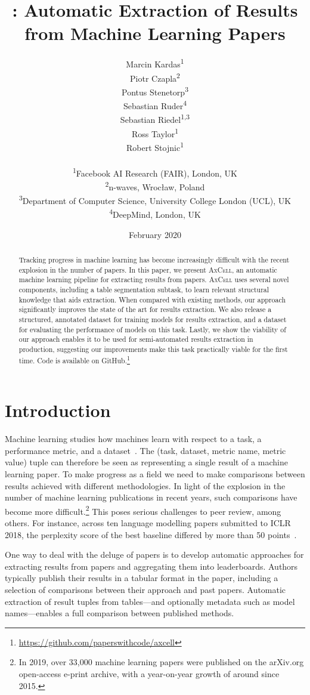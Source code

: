 \documentclass[11pt,a4paper]{article}
\title{\model{}: Automatic Extraction of Results\\from Machine Learning Papers}
\author{
  Marcin Kardas\textsuperscript{1}\\\And
  Piotr Czapla\textsuperscript{2}\\\And
  Pontus Stenetorp\textsuperscript{3}\\\AND
  Sebastian Ruder\textsuperscript{4}\\\And
  Sebastian Riedel\textsuperscript{1,3}\\\And
  Ross Taylor\textsuperscript{1}\\\And
  Robert Stojnic\textsuperscript{1}\\\AND\\
  \textsuperscript{1}Facebook AI Research (FAIR), London, UK\\
  \textsuperscript{2}n-waves, Wroc{\l}aw, Poland\\
  \textsuperscript{3}Department of Computer Science, University College London (UCL), UK\\
  \textsuperscript{4}DeepMind, London, UK\\
}
\date{February 2020}
\newcommand{\model}{\textsc{AxCell}}
\newcommand{\arxiv}{arXiv.org}
\newcommand{\anonurl}[1]{\url{#1}}
\newcommand{\anonurl}[1]{\url{https://ANONYMIZED}}
\begin{document}
\setlength{\belowcaptionskip}{-12pt}
\addtolength{\textfloatsep}{-0.15in}

\maketitle

\begin{abstract}
 Tracking progress in machine learning has become increasingly difficult with the recent explosion in the number of papers. In this paper, we present \model{}, an automatic machine learning pipeline for extracting results from papers. \model{} uses several novel components, including a table segmentation subtask, to learn relevant structural knowledge that aids extraction. When compared with existing methods, our approach significantly improves the state of the art for results extraction. We also release a structured, annotated dataset for training models for results extraction, and a dataset for evaluating the performance of models on this task. Lastly, we show the viability of our approach enables it to be used for semi-automated results extraction in production, suggesting our improvements make this task practically viable for the first time.
  Code is available on GitHub.\footnote{\anonurl{https://github.com/paperswithcode/axcell}}
 
\end{abstract} \section{Introduction}
Machine learning studies how machines learn with respect to a task, a performance metric, and a dataset~\citep{mitchell2006}.  The (task, dataset, metric name, metric value) tuple can therefore be seen as representing a single result of a machine learning paper. To make progress as a field we need to make comparisons between results achieved with different methodologies. In light of the explosion in the number of machine learning publications in recent years, such comparisons have become more difficult.\footnote{In 2019, over 33,000 machine learning papers were published on the \arxiv{} open-access e-print archive, with a year-on-year growth of around  since 2015.} This poses serious challenges to peer review, among others. For instance, across ten language modelling papers submitted to ICLR 2018, the perplexity score of the best baseline differed by more than 50 points~\cite{Ruder2018}.

One way to deal with the deluge of papers is to develop automatic approaches for extracting results from papers and aggregating them into leaderboards.
Authors typically publish their results in a tabular format in the paper, including a selection of comparisons between their approach and past papers. Automatic extraction of result tuples from tables---and optionally metadata such as model names---enables a full comparison between published methods.
\end{document}
